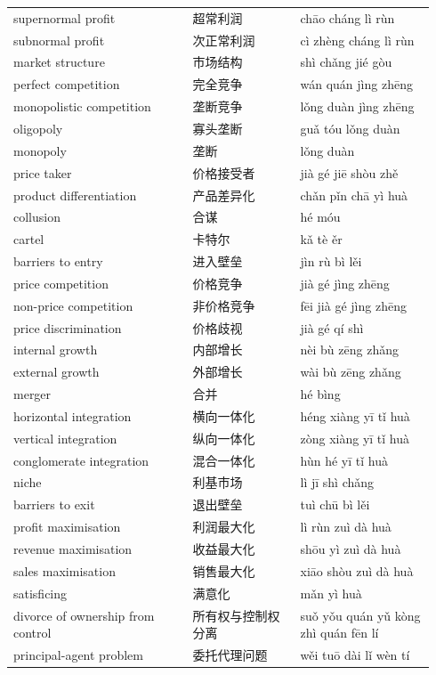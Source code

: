 \documentclass[11pt]{article}
\begin{document}
\begin{longtable}{@{}p{0.40\linewidth}p{0.24\linewidth}p{0.30\linewidth}@{}}
supernormal profit & 超常利润 & chāo cháng lì rùn \\
subnormal profit & 次正常利润 & cì zhèng cháng lì rùn \\
market structure & 市场结构 & shì chǎng jié gòu \\
perfect competition & 完全竞争 & wán quán jìng zhēng \\
monopolistic competition & 垄断竞争 & lǒng duàn jìng zhēng \\
oligopoly & 寡头垄断 & guǎ tóu lǒng duàn \\
monopoly & 垄断 & lǒng duàn \\
price taker & 价格接受者 & jià gé jiē shòu zhě \\
product differentiation & 产品差异化 & chǎn pǐn chā yì huà \\
collusion & 合谋 & hé móu \\
cartel & 卡特尔 & kǎ tè ěr \\
barriers to entry & 进入壁垒 & jìn rù bì lěi \\
price competition & 价格竞争 & jià gé jìng zhēng \\
non-price competition & 非价格竞争 & fēi jià gé jìng zhēng \\
price discrimination & 价格歧视 & jià gé qí shì \\
internal growth & 内部增长 & nèi bù zēng zhǎng \\
external growth & 外部增长 & wài bù zēng zhǎng \\
merger & 合并 & hé bìng \\
horizontal integration & 横向一体化 & héng xiàng yī tǐ huà \\
vertical integration & 纵向一体化 & zòng xiàng yī tǐ huà \\
conglomerate integration & 混合一体化 & hùn hé yī tǐ huà \\
niche & 利基市场 & lì jī shì chǎng \\
barriers to exit & 退出壁垒 & tuì chū bì lěi \\
profit maximisation & 利润最大化 & lì rùn zuì dà huà \\
revenue maximisation & 收益最大化 & shōu yì zuì dà huà \\
sales maximisation & 销售最大化 & xiāo shòu zuì dà huà \\
satisficing & 满意化 & mǎn yì huà \\
divorce of ownership from control & 所有权与控制权分离 & suǒ yǒu quán yǔ kòng zhì quán fēn lí \\
principal-agent problem & 委托代理问题 & wěi tuō dài lǐ wèn tí \\
\end{longtable}
\end{document}
